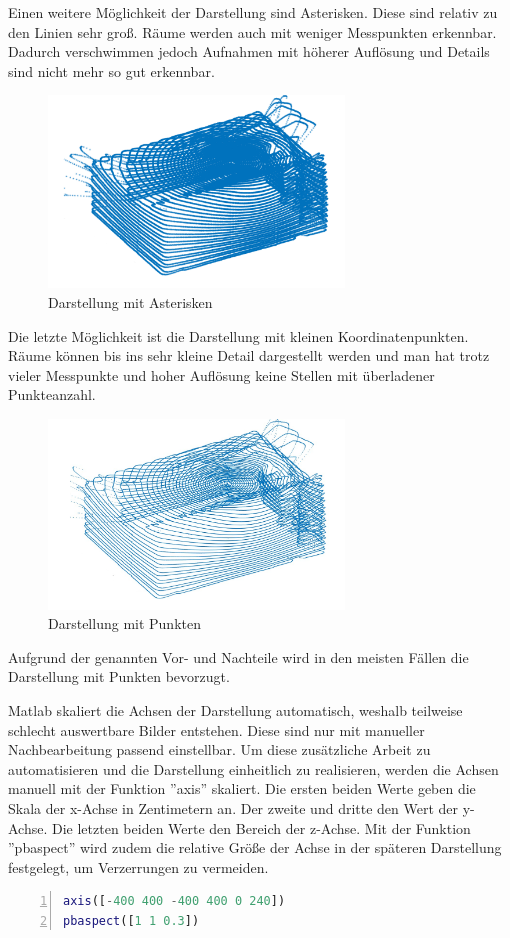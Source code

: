 Einen weitere Möglichkeit der Darstellung sind Asterisken. Diese sind relativ zu den Linien sehr groß. Räume werden auch mit weniger Messpunkten erkennbar. Dadurch verschwimmen jedoch Aufnahmen mit höherer Auflösung und Details sind nicht mehr so gut erkennbar. 


\begin{figure}[H]
	\centering
	\includegraphics[width=0.7\textwidth]{images/Auswertung/Sternchen}
	\caption{Darstellung mit Asterisken}
	\label{asterisken}
\end{figure}

Die letzte Möglichkeit ist die Darstellung mit kleinen Koordinatenpunkten. Räume können bis ins sehr kleine Detail dargestellt werden und man hat trotz vieler Messpunkte und hoher Auflösung keine Stellen mit überladener Punkteanzahl. 



\begin{figure}[H]
	\centering
	\includegraphics[width=0.7\textwidth]{images/Auswertung/Punkte}
	\caption{Darstellung mit Punkten}
	\label{punkte}
\end{figure}

Aufgrund der genannten Vor- und Nachteile wird in den meisten Fällen die Darstellung mit Punkten bevorzugt.  

Matlab skaliert die Achsen der Darstellung automatisch, weshalb teilweise schlecht auswertbare Bilder entstehen. Diese sind nur mit manueller Nachbearbeitung passend einstellbar. Um diese zusätzliche Arbeit zu automatisieren und die Darstellung einheitlich zu realisieren, werden die Achsen manuell mit der Funktion ''axis'' skaliert. Die ersten beiden Werte geben die Skala der x-Achse in Zentimetern an. Der zweite und dritte den Wert der y-Achse. Die letzten beiden Werte den Bereich der z-Achse.
Mit der Funktion ''pbaspect'' wird zudem die relative Größe der Achse in der späteren Darstellung festgelegt, um Verzerrungen zu vermeiden. 

\begin{lstlisting}[caption={Skalieren der Achsen},language={Matlab}, label={import_data}, numbers=left]
axis([-400 400 -400 400 0 240])
pbaspect([1 1 0.3])
\end{lstlisting}




